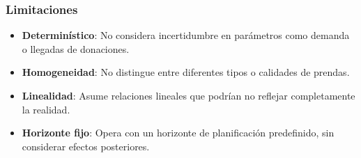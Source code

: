 \subsubsection*{Limitaciones}
\begin{itemize}
    \item \textbf{Determinístico}: No considera incertidumbre en parámetros como demanda o llegadas de donaciones.
    \item \textbf{Homogeneidad}: No distingue entre diferentes tipos o calidades de prendas.
    \item \textbf{Linealidad}: Asume relaciones lineales que podrían no reflejar completamente la realidad.
    \item \textbf{Horizonte fijo}: Opera con un horizonte de planificación predefinido, sin considerar efectos posteriores.
\end{itemize}